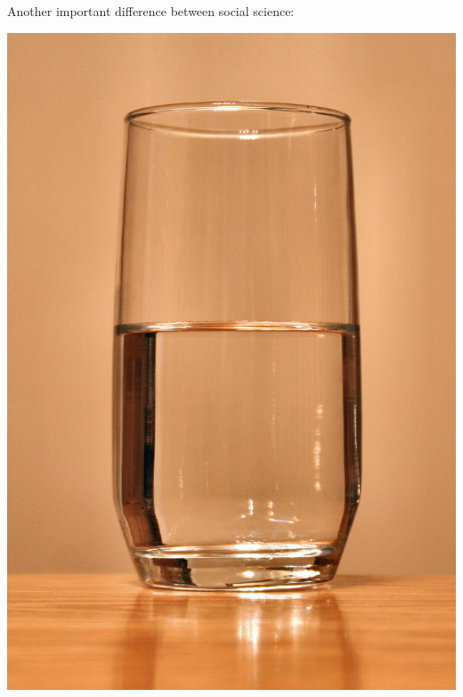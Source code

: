 \documentclass{beamer}
\def\vf{\vfill}
\begin{document}
\begin{frame}

Another important difference between social science:
\begin{center}
\includegraphics[height=0.8\textheight]{figures/glass-of-water.jpg}
\end{center}

\vf
\vspace{0.5in}
\usepackage{subfigure}
\usepackage{booktabs}
\usepackage{framed}
\usepackage{comment}

\def\vf{\vfill}

\newcommand{\goals}{
\begin{itemize}
\item SWBAT \emph{describe} the goals of the course
\item SWBAT \emph{describe} the activities that they will do in the course
\item SWBAT \emph{describe} the style of the course
\item SWBAT \emph{meet} other people in the class with similar interests
\end{itemize}
}


\end{frame}
\end{document}
